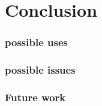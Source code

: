 \chapter{Conclusion}



\subsection{possible uses}
\subsection{possible issues}
\subsection{Future work}